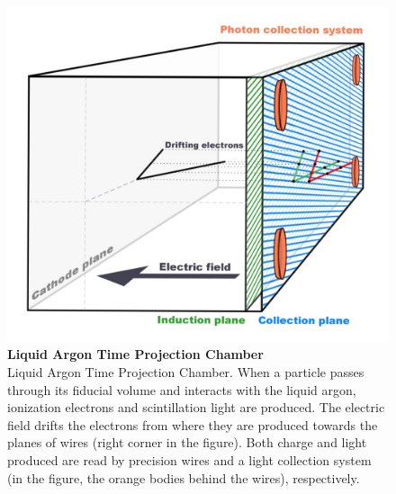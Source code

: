 \begin{figure}
	\begin{center}
		\includegraphics[scale=0.1]{Figures/LARTPC.jpg}
		\caption[LArTPC]{ {\textbf{Liquid Argon Time Projection Chamber}} \\ Liquid Argon Time Projection Chamber. When a particle passes through its fiducial volume and interacts with the liquid argon, ionization electrons and scintillation light are produced. The electric field drifts the electrons from where they are produced towards the planes of wires (right corner in the figure). Both charge and light produced are read by precision wires and a light collection system (in the figure, the orange bodies behind the wires), respectively.}
		\label{lartpc}	
	\end{center}
\end{figure}


